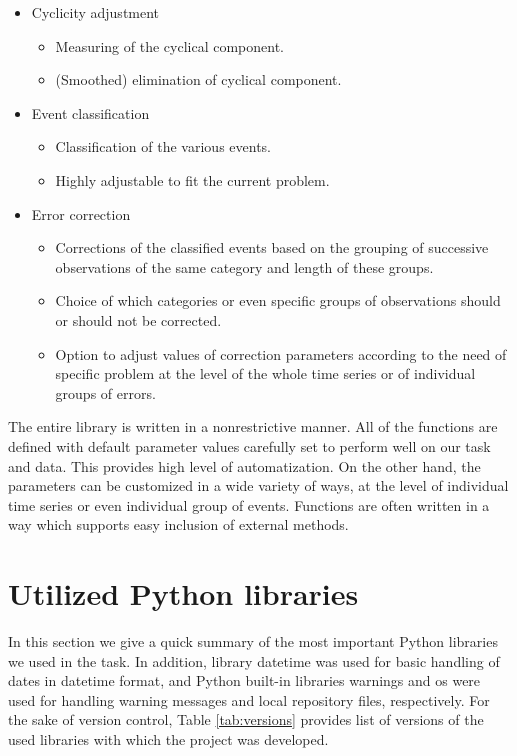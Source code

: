 \documentclass[12pt,a4paper]{article}
\begin{document}
\begin{itemize}
    
    \item Cyclicity adjustment
    \begin{itemize}
        \item Measuring of the cyclical component.
        \item (Smoothed) elimination of cyclical component.
    \end{itemize}
    
    \item Event classification
    \begin{itemize}
        \item Classification of the various events.
        \item Highly adjustable to fit the current problem.
    \end{itemize}
    
    \item Error correction
    \begin{itemize}
        \item Corrections of the classified events based on the grouping of successive observations of the same category and length of these groups.
        \item Choice of which categories or even specific groups of observations should or should not be corrected.
        \item Option to adjust values of correction parameters according to the need of specific problem at the level of the whole time series or of individual groups of errors.
    \end{itemize}
    
\end{itemize}

The entire library is written in a nonrestrictive manner. All of the functions are defined with default parameter values carefully set to perform well on our task and data. This provides high level of automatization. On the other hand, the parameters can be customized in a wide variety of ways, at the level of individual time series or even individual group of events. Functions are often written in a way which supports easy inclusion of external methods.





\newpage
\section{Utilized Python libraries}


In this section we give a quick summary of the most important Python libraries we used in the task. In addition, library datetime was used for basic handling of dates in datetime format, and Python built-in libraries warnings and os  were used for handling warning messages and  local repository files, respectively. For the sake of version control, Table \ref{tab:versions} provides list of versions of the used libraries with which the project was developed.  
\end{document}
